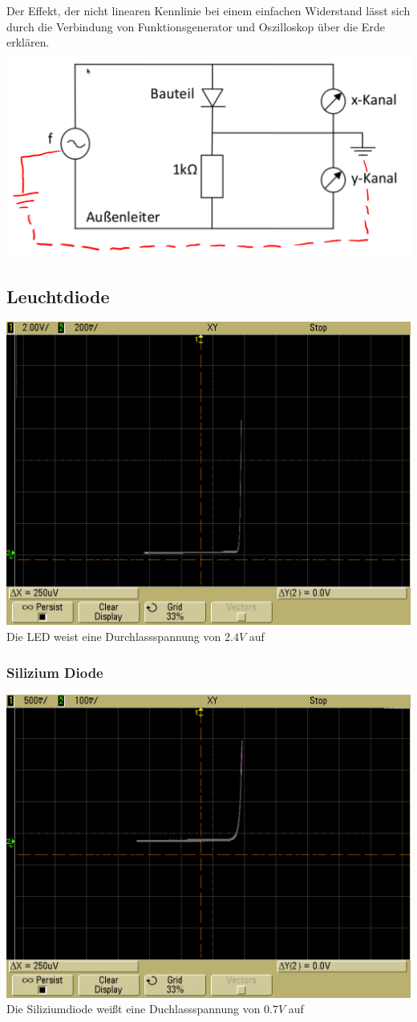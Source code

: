 \documentclass[compress,11pt]{beamer}
\begin{document}
\begin{frame}
Der Effekt, der nicht linearen Kennlinie bei einem einfachen Widerstand lässt sich durch die Verbindung von Funktionsgenerator und Oszilloskop über die Erde erklären.
\includegraphics[width=\textwidth]{images/3-erde.png}
\end{frame}
\subsection{Leuchtdiode}
\begin{frame}
	\includegraphics[width=.6\textwidth]{images/scope_8}\\
	Die LED weist eine Durchlassspannung von $2.4V$ auf
\end{frame}
\subsubsection{Silizium Diode}
\begin{frame}
	\includegraphics[width=.6\textwidth]{images/scope_11}\\
	Die Siliziumdiode weißt eine Duchlassspannung von $0.7V$ auf
\end{frame}
\end{document}
